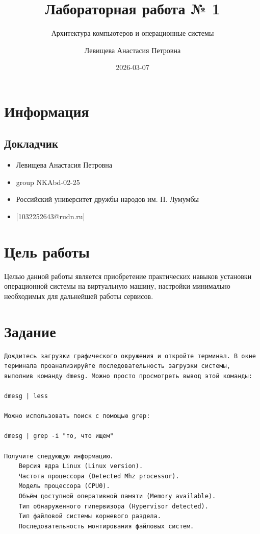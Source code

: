 \documentclass[
  russian,
  letterpaper,
  DIV=11,
  numbers=noendperiod]{scrartcl}
\title{Лабораторная работа № 1}
\subtitle{Архитектура компьютеров и операционные системы}
\author{Левищева Анастасия Петровна}
\date{2026-03-07}
\providecommand{\tightlist}{%
  \setlength{\itemsep}{0pt}\setlength{\parskip}{0pt}}
\begin{document}
\maketitle


\section{Информация}\label{ux438ux43dux444ux43eux440ux43cux430ux446ux438ux44f}

\subsection{Докладчик}\label{ux434ux43eux43aux43bux430ux434ux447ux438ux43a}

\begin{itemize}
\tightlist
\item
  Левищева Анастасия Петровна
\item
  group NKAbd-02-25
\item
  Российский университет дружбы народов им. П. Лумумбы
\item
  {[}1032252643@rudn.ru{]}
\end{itemize}

\section{Цель
работы}\label{ux446ux435ux43bux44c-ux440ux430ux431ux43eux442ux44b}

Целью данной работы является приобретение практических навыков установки
операционной системы на виртуальную машину, настройки минимально
необходимых для дальнейшей работы сервисов.

\section{Задание}\label{ux437ux430ux434ux430ux43dux438ux435}

\begin{verbatim}
Дождитесь загрузки графического окружения и откройте терминал. В окне терминала проанализируйте последовательность загрузки системы, выполнив команду dmesg. Можно просто просмотреть вывод этой команды:

dmesg | less

Можно использовать поиск с помощью grep:

dmesg | grep -i "то, что ищем"

Получите следующую информацию.
    Версия ядра Linux (Linux version).
    Частота процессора (Detected Mhz processor).
    Модель процессора (CPU0).
    Объём доступной оперативной памяти (Memory available).
    Тип обнаруженного гипервизора (Hypervisor detected).
    Тип файловой системы корневого раздела.
    Последовательность монтирования файловых систем.
\end{verbatim}
\end{document}
